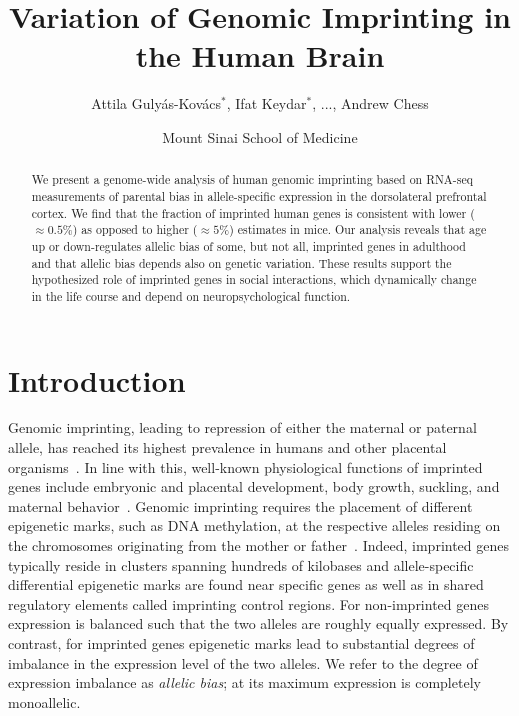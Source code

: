 \documentclass[letterpaper]{article}
\title{Variation of Genomic Imprinting in the Human Brain}
\author{Attila Guly\'{a}s-Kov\'{a}cs\(^\ast\), Ifat Keydar\(^\ast\),
...,
Andrew Chess}
\date{Mount Sinai School of Medicine}
\begin{document}
\maketitle

\begin{abstract}
We present a
genome-wide analysis of human genomic imprinting based on
RNA-seq measurements of
parental bias in allele-specific expression in the
dorsolateral prefrontal cortex.  We find that the fraction of imprinted human
genes is consistent with lower (\(\approx 0.5\%\)) as opposed to higher
(\(\approx 5\%\)) estimates in mice.  Our analysis reveals that age up or
down-regulates allelic bias of some, but not all, imprinted genes
in adulthood
and
that allelic bias depends also on genetic variation.
These results support the
hypothesized role of imprinted genes in social interactions, which dynamically
change in the life course and depend on neuropsychological function.
\end{abstract}

\section{Introduction}

Genomic imprinting, leading to repression of either the maternal or paternal
allele, has reached its highest prevalence in humans and other placental
organisms~\cite{Renfree2012}.  In line with this, well-known physiological
functions of imprinted genes include embryonic and placental development, body
growth, suckling, and maternal behavior~\cite{Plasschaert2014,Peters2014}.
Genomic imprinting requires the placement of different epigenetic marks, such
as DNA methylation, at the respective alleles residing on the chromosomes
originating from the mother or father~\cite{Plasschaert2014}.  Indeed,
imprinted genes typically reside in clusters spanning hundreds of kilobases
and allele-specific differential epigenetic marks are found near specific
genes as well as in shared regulatory elements called imprinting control
regions. For non-imprinted genes expression is balanced such that the two
alleles are roughly equally expressed. By contrast, for imprinted genes
epigenetic marks lead to substantial degrees of
imbalance in the expression level of the two alleles.  We refer to the degree
of expression imbalance as \emph{allelic bias}; at its maximum expression is
completely monoallelic.
\end{document}

